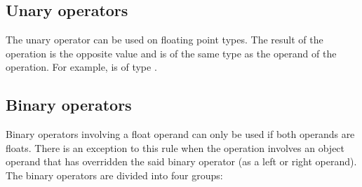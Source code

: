 \subsection{Unary operators}
\label{sec:org30770bf}

The \token{-} unary operator can be used on floating point types. The result
of the operation is the opposite value and is of the same type as the operand of
the operation. For example,  is of type .

\subsection{Binary operators}
\label{sec:orga43d13a}

Binary operators involving a float operand can only be used if both operands are
floats. There is an exception to this rule when the operation involves an object
operand that has overridden the said binary operator (as a left or right
operand). The binary operators are divided into four groups:

